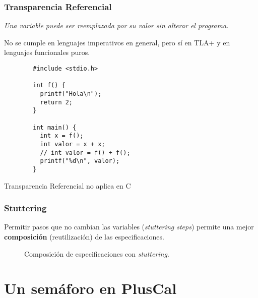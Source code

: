 \documentclass{beamer}
\begin{document}
\begin{frame}[fragile]
  \frametitle{Transparencia Referencial}

  \emph{Una variable puede ser reemplazada por su valor sin alterar el programa.}

  No se cumple en lenguajes imperativos en general, pero sí en TLA+ y en lenguajes funcionales puros.

  \begin{listing}[H]
    \begin{center}
      \begin{minipage}{0.7\textwidth}
        \begin{verbatim}
        #include <stdio.h>

        int f() {
          printf("Hola\n");
          return 2;
        }

        int main() {
          int x = f();
          int valor = x + x;
          // int valor = f() + f();
          printf("%d\n", valor);
        }
        \end{verbatim}
      \end{minipage}
    \end{center}
    \caption{Transparencia Referencial no aplica en C}
    \label{lst:c_ref}
  \end{listing}
\end{frame}

\begin{frame}[fragile]
  \frametitle{Stuttering}

  Permitir pasos que no cambian las variables (\emph{stuttering steps}) permite
  una mejor \textbf{composición} (reutilización) de las especificaciones.

  \begin{figure}[h]
      \centering
      
      \caption{Composición de especificaciones con \emph{stuttering}.}
      \label{fig:sem}
  \end{figure}
\end{frame}

\section{Un semáforo en PlusCal}
\end{document}
